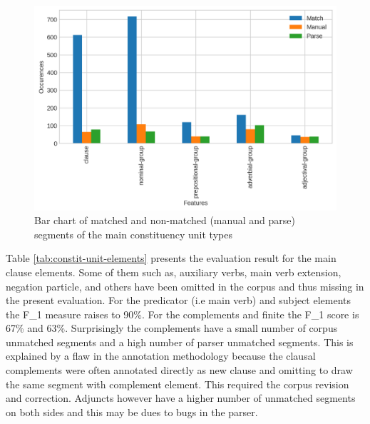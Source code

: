 \begin{figure}[!ht]
    \centering
    \includegraphics[width=.7\textwidth]{evaluation-results/figures/accuracy-syntactic-group-types}
    \caption{Bar chart of matched and non-matched (manual and parse) segments of the main constituency unit types}
    \label{fig:constit-unit-types}
\end{figure}

Table \ref{tab:constit-unit-elements} presents the evaluation result for the main clause elements. Some of them such as, auxiliary verbs, main verb extension, negation particle, and others have been omitted in the corpus and thus missing in the present evaluation. For the predicator (i.e main verb) and subject elements the F_1 measure raises to 90\%. For the complements and finite the F_1 score is 67\% and 63\%. Surprisingly the complements have a small number of corpus unmatched segments and a high number of parser unmatched segments. This is explained by a flaw in the annotation methodology because the clausal complements were often annotated directly as new clause and omitting to draw the same segment with complement element. This required the corpus revision and correction. Adjuncts however have a higher number of unmatched segments on both sides and this may be dues to bugs in the parser.

